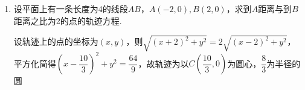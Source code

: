 \begin{enumerate}
\begin{jieda}
\begin{enumerate}
                $\therefore {AB}$ 的垂直平分线方程为 $y - \dfrac{1}{2} = 3\left( {x - \dfrac{3}{2}}\right)$ ,即 ${3x} - y - 4 = 0$ .
                
                联立 $\left\{  \begin{array}{l} {3x} - y - 4 = 0, \\  {2x} + y - 1 = 0, \end{array}\right.$ 解得 $\left\{  \begin{array}{l} x = 1, \\  y =  - 1, \end{array}\right.$
                
                $\therefore M\left( {1, - 1}\right)$ ,
                
                $\therefore {r}^{2} = {\left| MA\right| }^{2} = {\left( 3 - 1\right) }^{2} + {\left\lbrack  0 - \left( -1\right) \right\rbrack  }^{2} = 5$ ,
                
                $\therefore  \odot  M$ 的方程为 ${\left( x - 1\right) }^{2} + {\left( y + 1\right) }^{2} = 5$ .
            \end{enumerate}
        \end{jieda}
    \item 设平面上有一条长度为4的线段$AB$，$A(-2, 0), B(2, 0)$，求到$A$距离与到$B$距离之比为2的点的轨迹方程.
    \begin{jieda}
        设轨迹上的点的坐标为$(x, y)$，则$\sqrt{(x+2)^2+y^2} = 2\sqrt{(x-2)^2+y^2}$，平方化简得$\left(x-\dfrac{10}{3}\right)^2 + y^2 = \dfrac{64}{9}$，故轨迹为以$C\left(\dfrac{10}{3}, 0\right)$为圆心，$\dfrac{8}{3}$为半径的圆
    \end{jieda}
\end{enumerate}
